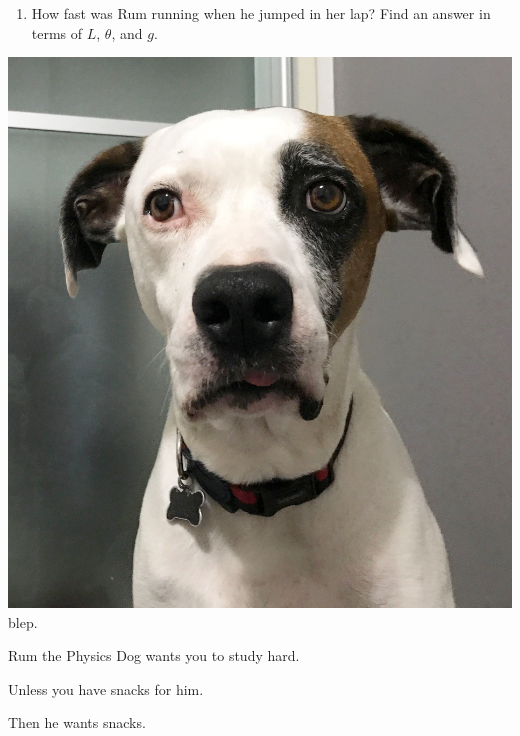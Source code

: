 \documentclass[12pt]{article}
\begin{document}
\begin{enumerate}
\begin{enumerate}
\item How fast was Rum running when he jumped in her lap? Find an answer in terms of $L$, $\theta$, and $g$.



\end{enumerate}

\newpage

\begin{minipage}{0.5\textwidth}
\begin{center}
\includegraphics[width=\textwidth]{rum.jpg}\\
\scriptsize blep.
\end{center}
\end{minipage}
\begin{minipage}{0.5\textwidth}
\begin{center}
Rum the Physics Dog wants you to study hard. 

\bigskip
 Unless you have snacks for him. 
\bigskip

 Then he wants snacks.
\end{center}
\end{minipage}
\newpage



\end{enumerate}
\end{document}
